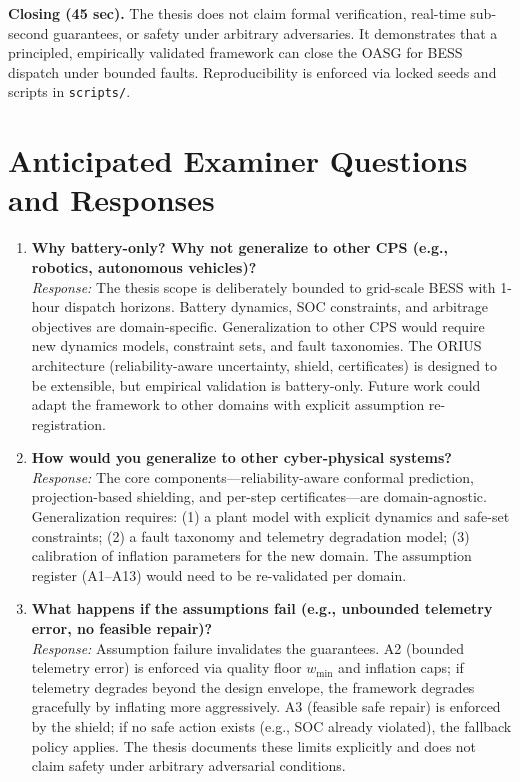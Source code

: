 \textbf{Closing (45 sec).} The thesis does not claim formal verification, real-time sub-second guarantees, or safety under arbitrary adversaries. It demonstrates that a principled, empirically validated framework can close the OASG for BESS dispatch under bounded faults. Reproducibility is enforced via locked seeds and scripts in \texttt{scripts/}.

\section{Anticipated Examiner Questions and Responses}
\label{sec:anticipated-questions}

\begin{enumerate}
\item \textbf{Why battery-only? Why not generalize to other CPS (e.g., robotics, autonomous vehicles)?} \\
\textit{Response:} The thesis scope is deliberately bounded to grid-scale BESS with 1-hour dispatch horizons. Battery dynamics, SOC constraints, and arbitrage objectives are domain-specific. Generalization to other CPS would require new dynamics models, constraint sets, and fault taxonomies. The ORIUS architecture (reliability-aware uncertainty, shield, certificates) is designed to be extensible, but empirical validation is battery-only. Future work could adapt the framework to other domains with explicit assumption re-registration.

\item \textbf{How would you generalize to other cyber-physical systems?} \\
\textit{Response:} The core components---reliability-aware conformal prediction, projection-based shielding, and per-step certificates---are domain-agnostic. Generalization requires: (1) a plant model with explicit dynamics and safe-set constraints; (2) a fault taxonomy and telemetry degradation model; (3) calibration of inflation parameters for the new domain. The assumption register (A1--A13) would need to be re-validated per domain.

\item \textbf{What happens if the assumptions fail (e.g., unbounded telemetry error, no feasible repair)?} \\
\textit{Response:} Assumption failure invalidates the guarantees. A2 (bounded telemetry error) is enforced via quality floor $w_{\min}$ and inflation caps; if telemetry degrades beyond the design envelope, the framework degrades gracefully by inflating more aggressively. A3 (feasible safe repair) is enforced by the shield; if no safe action exists (e.g., SOC already violated), the fallback policy applies. The thesis documents these limits explicitly and does not claim safety under arbitrary adversarial conditions.


\end{enumerate}
